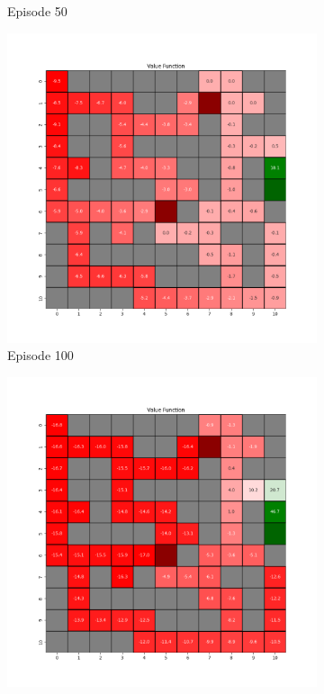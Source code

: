 \documentclass{assignment}
\begin{document}
\begin{figure}[H]
\begin{subfigure}{0.3\textwidth}
    \caption{Episode 50}
    \end{subfigure}\hfill
    \begin{subfigure}{0.3\textwidth}
        \includegraphics[width=\textwidth]{figures/value_q/epsilon_sweep/value_function_alpha_0.1_gamma_0.95_epsilon_1.0_iteration_100.png}
    \caption{Episode 100}
    \end{subfigure}
    \begin{subfigure}{0.3\textwidth}
        \includegraphics[width=\textwidth]{figures/value_q/epsilon_sweep/value_function_alpha_0.1_gamma_0.95_epsilon_1.0_iteration_1000.png}

\end{subfigure}
\end{figure}
\end{document}
